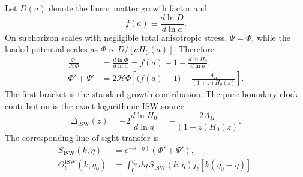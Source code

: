 \documentclass[11pt,letterpaper]{article}
\theoremstyle{plain}
\newcommand{\AH}{A_H}
\begin{document}
Let \(D(a)\) denote the linear matter growth factor and
\begin{equation}
\label{eq:shbt-growth-rate-definition}
 f(a)
 \equiv
 \frac{d\ln D}{d\ln a}.
\end{equation}
On subhorizon scales with negligible total anisotropic stress,
\(\Psi=\Phi\), while the loaded potential scales as
\(\Phi\propto D/[aH_0(a)]\).  Therefore
\begin{align}
\label{eq:shbt-potential-drift-derivation}
 \frac{\Phi'}{\mathcal H\Phi}
 &=
 \frac{d\ln\Phi}{d\ln a}
 =
 f(a)-1-\frac{d\ln H_0}{d\ln a},
 \\
\label{eq:shbt-potential-drift}
 \Phi'+\Psi'
 &=
 2\mathcal H\Phi
 \left[
 \bigl(f(a)-1\bigr)
 -
 \frac{\AH}{(1+z)H_0(z)}
 \right].
\end{align}
The first bracket is the standard growth contribution.  The pure
boundary-clock contribution is the exact logarithmic ISW source
\begin{equation}
\label{eq:shbt-boltzmann-isw-source}
 \boxed{
 \Delta_{\text{ISW}}(z)
 =
 -2\frac{d\ln H_0}{d\ln a}
 =
 -\frac{2\AH}{(1+z)H_0(z)}.}
\end{equation}
The corresponding line-of-sight transfer is
\begin{align}
\label{eq:shbt-isw-line-of-sight}
 S_{\text{ISW}}(k,\eta)
 &=
 e^{-\kappa(\eta)}
 \left(\Phi'+\Psi'\right),
 \\
 \Theta_\ell^{\text{ISW}}(k,\eta_0)
 &=
 \int_0^{\eta_0}
 d\eta\,
 S_{\text{ISW}}(k,\eta)
 j_\ell\!\left[k(\eta_0-\eta)\right].
\end{align}
\end{document}
